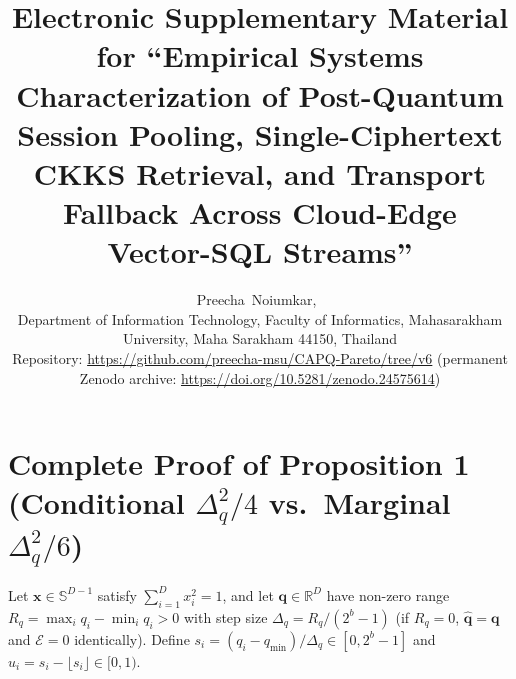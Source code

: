 \documentclass[10pt,journal,compsoc]{IEEEtran}
\begin{document}
\title{Electronic Supplementary Material for ``Empirical Systems Characterization of Post-Quantum Session Pooling, Single-Ciphertext CKKS Retrieval, and Transport Fallback Across Cloud-Edge Vector-SQL Streams''}
\author{Preecha~Noiumkar,~\\
\small Department of Information Technology, Faculty of Informatics, Mahasarakham University, Maha Sarakham 44150, Thailand\\
Repository: \protect\url{https://github.com/preecha-msu/CAPQ-Pareto/tree/v6} (permanent Zenodo archive: \url{https://doi.org/10.5281/zenodo.24575614})}
\maketitle

\section{Complete Proof of Proposition 1 (\texorpdfstring{Conditional $\Delta_q^2/4$ vs.\ Marginal $\Delta_q^2/6$}{Conditional vs. Marginal Variance})}
Let $\mathbf{x} \in \mathbb{S}^{D-1}$ satisfy $\sum_{i=1}^D x_i^2 = 1$, and let $\mathbf{q} \in \mathbb{R}^D$ have non-zero range $R_q = \max_i q_i - \min_i q_i > 0$ with step size $\Delta_q = R_q/(2^b - 1)$ (if $R_q = 0$, $\widehat{\mathbf{q}} = \mathbf{q}$ and $\mathcal{E} = 0$ identically). Define $s_i = (q_i - q_{\min})/\Delta_q \in [0, 2^b - 1]$ and $u_i = s_i - \lfloor s_i \rfloor \in [0, 1)$.
\end{document}
